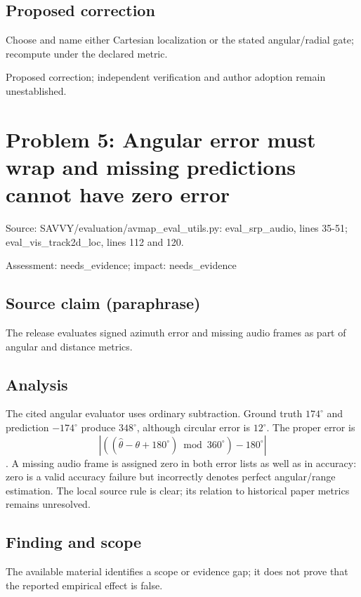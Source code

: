 \documentclass[11pt]{article}
\begin{document}
\subsection*{Proposed correction}

Choose and name either Cartesian localization or the stated angular/radial gate; recompute under the declared metric.

Proposed correction; independent verification and author adoption remain unestablished.

\section*{Problem 5: Angular error must wrap and missing predictions cannot have zero error}

Source: SAVVY/evaluation/avmap\_eval\_utils.py: eval\_srp\_audio, lines 35-51; eval\_vis\_track2d\_loc, lines 112 and 120.

Assessment: needs\_evidence; impact: needs\_evidence

\subsection*{Source claim (paraphrase)}

The release evaluates signed azimuth error and missing audio frames as part of angular and distance metrics.

\subsection*{Analysis}

The cited angular evaluator uses ordinary subtraction. Ground truth \(174^\circ\) and prediction \(-174^\circ\) produce \(348^\circ\), although circular error is \(12^\circ\). The proper error is \[\left|((\widehat\theta-\theta+180^\circ)\bmod360^\circ)-180^\circ\right|\]. A missing audio frame is assigned zero in both error lists as well as in accuracy: zero is a valid accuracy failure but incorrectly denotes perfect angular/range estimation. The local source rule is clear; its relation to historical paper metrics remains unresolved.

\subsection*{Finding and scope}

The available material identifies a scope or evidence gap; it does not prove that the reported empirical effect is false.
\end{document}
